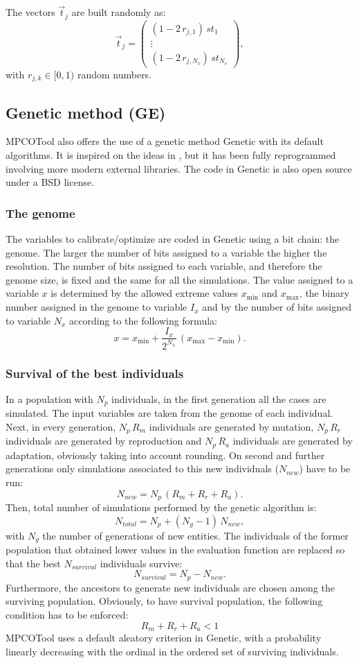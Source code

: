 \documentclass[review,authoryear]{elsarticle}
\newcommand{\EQ}[2]
{\begin{equation}#1\label{#2}\end{equation}}
\newcommand{\MATRIX}[2]{\PA{\begin{array}{#1}#2\end{array}}}
\newcommand{\PA}[1]{\left(#1\right)}
\begin{document}
The vectors $\vec{t}_j$ are built randomly as:
\EQ
{
	\vec{t}_j=\MATRIX{c}{\PA{1-2\,r_{j,1}}\,st_1\\\vdots\\
	\PA{1-2\,r_{j,N_v}}\,st_{N_v}},
}{EqtRandom}
with $r_{j,k}\in[0,1)$ random numbers.

\subsection{Genetic method (GE)}

MPCOTool also offers the use of a genetic method Genetic \citep{genetic} with its default algorithms.
It is inspired on the ideas in \citet{gaul}, but it has been fully reprogrammed involving more modern external libraries.
The code in Genetic is also open source under a BSD license.

\subsubsection{The genome}

The variables to calibrate/optimize are coded in Genetic using a bit chain: the
genome. The larger the number of bits assigned to a variable the higher the resolution.
The number of bits assigned to each variable, and therefore the genome size, is fixed and the same for all the 
simulations.
The value assigned to a variable $x$ is determined by the allowed extreme values $x_{\min}$ and $x_{\max}$, the binary number assigned in the genome to variable $I_x$ and by the number of bits assigned to variable $N_x$ according to
the following formula:
\EQ{x=x_{\min}+\frac{I_x}{2^{N_x}}\,\left(x_{\max}-x_{\min}\right).}{EqGenome}

\subsubsection{Survival of the best individuals}

In a population with $N_p$ individuals, in the first generation all the cases are simulated. The input variables are
taken from the genome of each individual. Next, in every generation, $N_p\,R_m$ individuals are generated by mutation, $N_p\,R_r$ individuals are generated by reproduction and $N_p\,R_a$ individuals are generated by adaptation, obviously
taking into account rounding. On second and further generations only simulations
associated to this new individuals ($N_{new}$) have to be run:
\EQ{N_{new}=N_p\,\left(R_m+R_r+R_a\right).}{EqNew}
Then, total number of simulations performed by the genetic algorithm is:
\EQ{N_{total}=N_p+\left(N_g-1\right)\,N_{new},}{EqGeneticNumber}
with $N_g$ the number of generations of new entities.
The individuals of the former population that obtained lower values in the evaluation function are replaced so that the best $N_{survival}$ individuals survive:
\EQ{N_{survival}=N_p-N_{new}.}{EqSurvival}
Furthermore, the ancestors to generate new individuals are chosen among the surviving population. Obviously, to have survival population, the following condition has to be enforced:
\EQ{R_m+R_r+R_a<1}{EqSurvivalCondition}
MPCOTool uses a default aleatory criterion in Genetic, with a probability linearly decreasing with the ordinal in the ordered set of surviving individuals.
\end{document}
